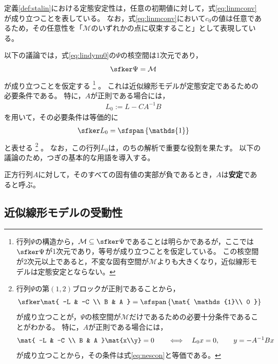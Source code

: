 \documentclass[tombow,dvipdfmx]{corona-a5-1.1}
\begin{document}
定義\ref{def:stalin}における定態安定性は，任意の初期値に対して，式\ref{eq:linmconv}が成り立つことを表している。
なお，式\ref{eq:linmconv}において$c_0$の値は任意であるため，その任意性を「$\mathcal{M}$のいずれかの点に収束すること」として表現している。


以下の議論では，式\ref{eq:lindynu0}の$\Psi$の核空間は1次元であり，
\[
\sfker \Psi = \mathcal{M}
\]
が成り立つことを仮定する
\footnote{
行列$\Psi$の構造から，$\mathcal{M} \subseteq \sfker \Psi $であることは明らかであるが，ここでは$\sfker \Psi$が1次元であり，等号が成り立つことを仮定している。
この核空間が2次元以上であると，不変な固有空間が$\mathcal{M}$よりも大きくなり，近似線形モデルは定態安定とならない。
}
。
これは近似線形モデルが定態安定であるための必要条件である。
特に，$A$が正則である場合には，
\begin{align}\label{eq:defL0}
L_0:= L-CA^{-1}B 
\end{align}
を用いて，その必要条件は等価的に
\begin{align}\label{eq:nescon}
\sfker L_0 = \sfspan
\left\{
\mathds{1}
\right\}
\end{align}
と表せる
\footnote{
行列$\Psi$の第$(1,2)$ブロックが正則であることから，
\begin{align*}%
\sfker \mat{
-L & -C \\
B & A
}
= \sfspan
\left\{
\mat{
\mathds{1}\\
0
}
\right\}
\end{align*}
が成り立つことが，$\Psi$の核空間が$\mathcal{M}$だけであるための必要十分条件であることがわかる。
特に，$A$が正則である場合には，
\begin{align*}
\mat{
-L & -C \\
B & A
}\mat{x\\y}
=0
\qquad
\Longleftrightarrow
\quad
L_0 x=0,
\qquad
y=-A^{-1}Bx
\end{align*}
が成り立つことから，その条件は式\ref{eq:nescon}と等価である。
}
。
なお，この行列$L_0$は，のちの解析で重要な役割を果たす。
以下の議論のため，つぎの基本的な用語を導入する。

\begin{定義}[正方行列の安定性]
\label{def:matsta}
正方行列$A$に対して，そのすべての固有値の実部が負であるとき，$A$は\textbf{安定}であると呼ぶ。
\end{定義}



\subsection{近似線形モデルの受動性\advanced}\label{sec:linpasana}
\end{document}
